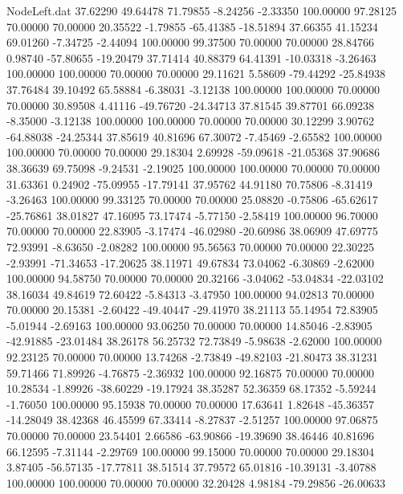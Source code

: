 \begin{filecontents}{NodeLeft.dat}
  37.62290   49.64478   71.79855    -8.24256   -2.33350  100.00000   97.28125   70.00000   70.00000   20.35522   -1.79855  -65.41385  -18.51894
  37.66355   41.15234   69.01260    -7.34725   -2.44094  100.00000   99.37500   70.00000   70.00000   28.84766    0.98740  -57.80655  -19.20479
  37.71414   40.88379   64.41391   -10.03318   -3.26463  100.00000  100.00000   70.00000   70.00000   29.11621    5.58609  -79.44292  -25.84938
  37.76484   39.10492   65.58884    -6.38031   -3.12138  100.00000  100.00000   70.00000   70.00000   30.89508    4.41116  -49.76720  -24.34713
  37.81545   39.87701   66.09238    -8.35000   -3.12138  100.00000  100.00000   70.00000   70.00000   30.12299    3.90762  -64.88038  -24.25344
  37.85619   40.81696   67.30072    -7.45469   -2.65582  100.00000  100.00000   70.00000   70.00000   29.18304    2.69928  -59.09618  -21.05368
  37.90686   38.36639   69.75098    -9.24531   -2.19025  100.00000  100.00000   70.00000   70.00000   31.63361    0.24902  -75.09955  -17.79141
  37.95762   44.91180   70.75806    -8.31419   -3.26463  100.00000   99.33125   70.00000   70.00000   25.08820   -0.75806  -65.62617  -25.76861
  38.01827   47.16095   73.17474    -5.77150   -2.58419  100.00000   96.70000   70.00000   70.00000   22.83905   -3.17474  -46.02980  -20.60986
  38.06909   47.69775   72.93991    -8.63650   -2.08282  100.00000   95.56563   70.00000   70.00000   22.30225   -2.93991  -71.34653  -17.20625
  38.11971   49.67834   73.04062    -6.30869   -2.62000  100.00000   94.58750   70.00000   70.00000   20.32166   -3.04062  -53.04834  -22.03102
  38.16034   49.84619   72.60422    -5.84313   -3.47950  100.00000   94.02813   70.00000   70.00000   20.15381   -2.60422  -49.40447  -29.41970
  38.21113   55.14954   72.83905    -5.01944   -2.69163  100.00000   93.06250   70.00000   70.00000   14.85046   -2.83905  -42.91885  -23.01484
  38.26178   56.25732   72.73849    -5.98638   -2.62000  100.00000   92.23125   70.00000   70.00000   13.74268   -2.73849  -49.82103  -21.80473
  38.31231   59.71466   71.89926    -4.76875   -2.36932  100.00000   92.16875   70.00000   70.00000   10.28534   -1.89926  -38.60229  -19.17924
  38.35287   52.36359   68.17352    -5.59244   -1.76050  100.00000   95.15938   70.00000   70.00000   17.63641    1.82648  -45.36357  -14.28049
  38.42368   46.45599   67.33414    -8.27837   -2.51257  100.00000   97.06875   70.00000   70.00000   23.54401    2.66586  -63.90866  -19.39690
  38.46446   40.81696   66.12595    -7.31144   -2.29769  100.00000   99.15000   70.00000   70.00000   29.18304    3.87405  -56.57135  -17.77811
  38.51514   37.79572   65.01816   -10.39131   -3.40788  100.00000  100.00000   70.00000   70.00000   32.20428    4.98184  -79.29856  -26.00633

\end{filecontents}
